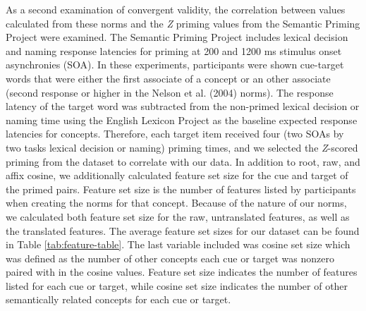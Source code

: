 \documentclass[english,man]{apa6}
\theoremstyle{definition}
\theoremstyle{definition}
\theoremstyle{definition}
\theoremstyle{remark}
\begin{document}
As a second examination of convergent validity, the correlation between
values calculated from these norms and the \emph{Z} priming values from
the Semantic Priming Project were examined. The Semantic Priming Project
includes lexical decision and naming response latencies for priming at
200 and 1200 ms stimulus onset asynchronies (SOA). In these experiments,
participants were shown cue-target words that were either the first
associate of a concept or an other associate (second response or higher
in the Nelson et al. (2004) norms). The response latency of the target
word was subtracted from the non-primed lexical decision or naming time
using the English Lexicon Project as the baseline expected response
latencies for concepts. Therefore, each target item received four (two
SOAs by two tasks lexical decision or naming) priming times, and we
selected the \emph{Z}-scored priming from the dataset to correlate with
our data. In addition to root, raw, and affix cosine, we additionally
calculated feature set size for the cue and target of the primed pairs.
Feature set size is the number of features listed by participants when
creating the norms for that concept. Because of the nature of our norms,
we calculated both feature set size for the raw, untranslated features,
as well as the translated features. The average feature set sizes for
our dataset can be found in Table \ref{tab:feature-table}. The last
variable included was cosine set size which was defined as the number of
other concepts each cue or target was nonzero paired with in the cosine
values. Feature set size indicates the number of features listed for
each cue or target, while cosine set size indicates the number of other
semantically related concepts for each cue or target.
\end{document}
